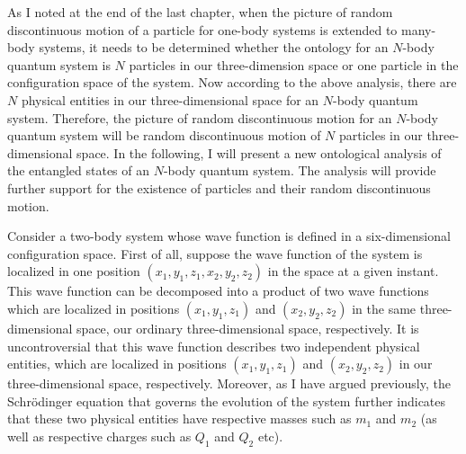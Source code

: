 As I noted at the end of the last chapter, 
when the picture of random discontinuous motion of a particle for one-body systems is extended to many-body systems, it needs to be determined whether the ontology for an $N$-body quantum system is $N$ particles in our three-dimension space or one particle in the configuration space of the system.
Now according to the above analysis, there are $N$ physical entities in our three-dimensional space for an $N$-body quantum system.
Therefore, the picture of random discontinuous motion for an $N$-body quantum system will be random discontinuous motion of $N$ particles in our three-dimensional space.
In the following, I will present a new ontological analysis of the entangled states of an $N$-body quantum system. The analysis will provide further support for the existence of particles and their random discontinuous motion.

Consider a two-body system whose wave function is defined in a six-dimensional configuration space. First of all, suppose the wave function of the system is localized in one position $(x_1, y_1, z_1, x_2, y_2, z_2)$ in the space at a given instant. This wave function can be decomposed into a product of two wave functions which are localized in positions $(x_1,y_1,z_1)$ and $(x_2,y_2,z_2)$ in the same three-dimensional space, our ordinary three-dimensional space, respectively. It is uncontroversial that this wave function describes two independent physical entities, which are localized in positions $(x_1,y_1,z_1)$ and $(x_2,y_2,z_2)$ in our three-dimensional space, respectively. Moreover, as I have argued previously, the Schr\"{o}dinger equation that governs the evolution of the system further indicates that these two physical entities have respective masses such as $m_1$ and $m_2$ (as well as respective charges such as $Q_1$ and $Q_2$ etc). 

